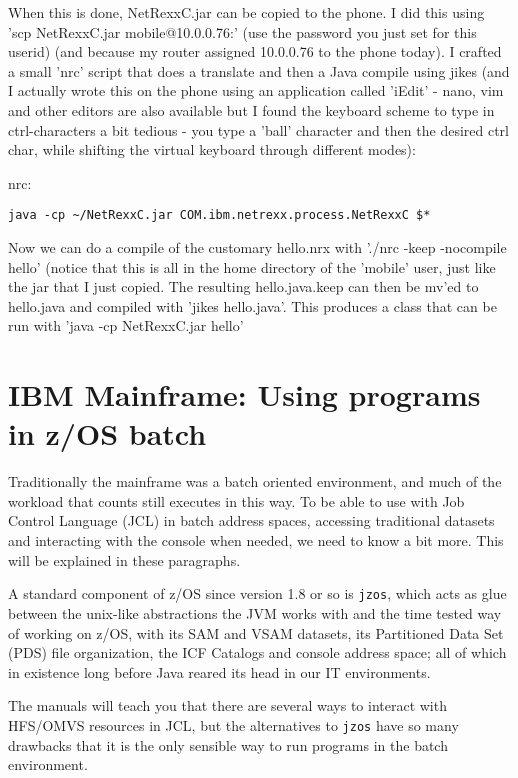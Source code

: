 {When this is done, NetRexxC.jar can be copied to the phone. I did this using 'scp NetRexxC.jar mobile@10.0.0.76:' (use the password you just set for this userid) (and because my router assigned 10.0.0.76 to the phone today). I crafted a small 'nrc' script that does a translate and then a Java compile using jikes (and I actually wrote this on the phone using an application called 'iEdit' - nano, vim and other editors are also available but I found the keyboard scheme to type in ctrl-characters a bit tedious - you type a 'ball' character and then the desired ctrl char, while shifting the virtual keyboard through different modes):

nrc:
\begin{verbatim}
java -cp ~/NetRexxC.jar COM.ibm.netrexx.process.NetRexxC $*
\end{verbatim}
Now we can do a compile of the customary hello.nrx with './nrc -keep -nocompile hello' (notice that this is all in the home directory of the 'mobile' user, just like the jar that I just copied. The resulting hello.java.keep can then be mv'ed to hello.java and compiled with 'jikes hello.java'. This produces a class that can be run with 'java -cp NetRexxC.jar hello'
\section{IBM Mainframe: Using \nr{} programs in z/OS batch}
Traditionally the mainframe was a batch oriented environment, and much
of the workload that counts still executes in this way. To be able to
use \nr{} with Job Control Language (JCL) in batch address spaces,
accessing traditional datasets and interacting with the console when
needed, we need to know a bit more. This will be explained in these paragraphs.

A standard component of z/OS since version 1.8 or so is \texttt{jzos},
which acts as glue between the unix-like abstractions the JVM works
with and the time tested way of working on z/OS, with its SAM and VSAM
datasets, its Partitioned Data Set (PDS) file organization, the ICF
Catalogs and console address space; all of which in existence long
before Java reared its head in our IT environments.

The manuals will teach you that there are several ways to
interact with HFS/OMVS resources in JCL, but the alternatives to
\texttt{jzos} have so many drawbacks that it is the only
sensible way to run \nr{} programs in the batch environment. 

}
